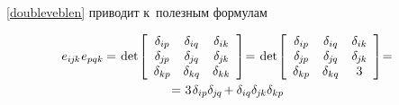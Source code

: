 \begin{otherlanguage}{russian}
~\eqref{doubleveblen} приводит к~полезным формулам

\nopagebreak\vspace{-0.2em}\begin{equation*}\begin{array}{c}
e_{i\hspace{-0.1ex}j\hspace{-0.1ex}k} \hspace{.1ex} e_{pqk} \hspace{-0.1ex} = \hspace{.2ex}
\operatorname{det} \hspace{-0.25ex} \left[
\begin{array}{ccc}
\delta_{ip} & \delta_{iq} & \delta_{ik} \\
\delta_{\hspace{-0.1ex}j\hspace{-0.1ex}p} & \delta_{\hspace{-0.1ex}j\hspace{-0.1ex}q} & \delta_{\hspace{-0.1ex}j\hspace{-0.1ex}k} \\
\delta_{kp} & \delta_{kq} & \delta_{kk}
\end{array}
\right] \hspace{-0.5ex} = \hspace{.2ex}
\operatorname{det} \hspace{-0.25ex} \left[
\begin{array}{ccc}
\delta_{ip} & \delta_{iq} & \delta_{ik} \\
\delta_{\hspace{-0.1ex}j\hspace{-0.1ex}p} & \delta_{\hspace{-0.1ex}j\hspace{-0.1ex}q} & \delta_{\hspace{-0.1ex}j\hspace{-0.1ex}k} \\
\delta_{kp} & \delta_{kq} & 3
\end{array}
\right] \hspace{-0.5ex} =
\\[1.5em]
%
= \hspace{.1ex} 3 \hspace{.2ex} \delta_{ip} \delta_{\hspace{-0.1ex}j\hspace{-0.1ex}q} \hspace{-0.2ex}
+ \delta_{iq} \delta_{\hspace{-0.1ex}j\hspace{-0.1ex}k} \delta_{kp} \hspace{-0.2ex}

\end{array}
\end{equation*}
\end{otherlanguage}
